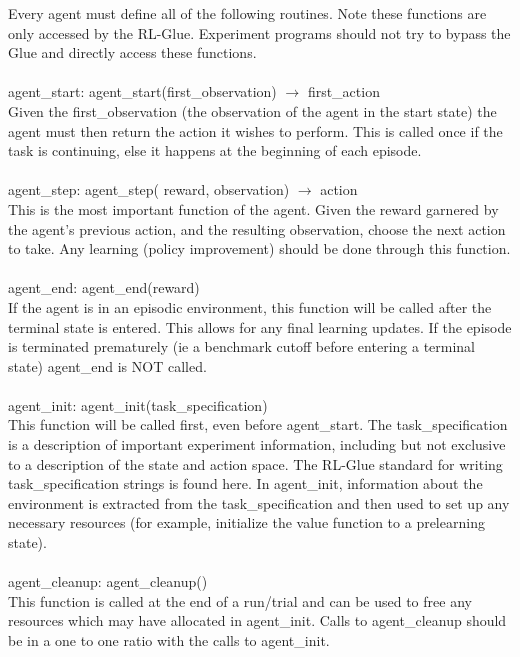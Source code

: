 \documentclass[11pt]{article}
\begin{document}
Every agent must define all of the following routines. Note these functions are only accessed by the RL-Glue. Experiment programs should not try to bypass the Glue and directly access these functions.
\\\\
agent\_start:  agent\_start(first\_observation) $\rightarrow$ first\_action\\
Given the first\_observation (the observation of the agent in the start state) the agent must then return the action it wishes to perform. This is called once if the task is continuing, else it happens at the beginning of each episode.
\\\\
agent\_step: agent\_step( reward, observation) $\rightarrow$ action\\
This is the most important function of the agent. Given the reward garnered by the agent's previous action, and the resulting observation, choose the next action to take. Any learning (policy improvement) should be done through this function.
\\\\
agent\_end: agent\_end(reward)\\
If the agent is in an episodic environment, this function will be called after the terminal state is entered. This allows for any final learning updates. If the episode is terminated prematurely (ie a benchmark cutoff before entering a terminal state) agent\_end is NOT called.
\\\\
agent\_init: agent\_init(task\_specification)\\
This function will be called first, even before agent\_start. The task\_specification is a description of important experiment information, including but not exclusive to a description of the state and action space. The RL-Glue standard for writing task\_specification strings is found here.  In agent\_init, information about the environment is extracted from the task\_specification and then used to set up any necessary resources (for example, initialize the value function to a prelearning state).
\\\\
agent\_cleanup: agent\_cleanup()\\
This function is called at the end of a run/trial and can be used to free any resources which may have allocated in agent\_init. Calls to agent\_cleanup should be in a one to one ratio with the calls to agent\_init.
\\\\
\end{document}
